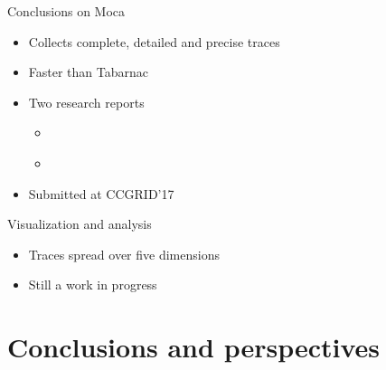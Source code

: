 \documentclass[xcolor={usenames,dvipsnames},hyperref={pdfusetitle}]{beamer}
\begin{document}
\begin{frame}{Conclusions on Moca}
    \begin{block}{}
        \begin{itemize}
            \item Collects complete, detailed and precise traces
            \item Faster than Tabarnac
            \item Two research reports
                \begin{itemize}
                    \item \cite{Beniamine15Memory}
                    \item \cite{Beniamine16Moca}
                \end{itemize}
            \item Submitted at CCGRID'17
        \end{itemize}
    \end{block}
    \pause
    \begin{alertblock}{Visualization and analysis}
        \begin{itemize}
            \item Traces spread over five dimensions
            \item Still a work in progress
        \end{itemize}
    \end{alertblock}
\end{frame}

\section{Conclusions and perspectives}
\end{document}
